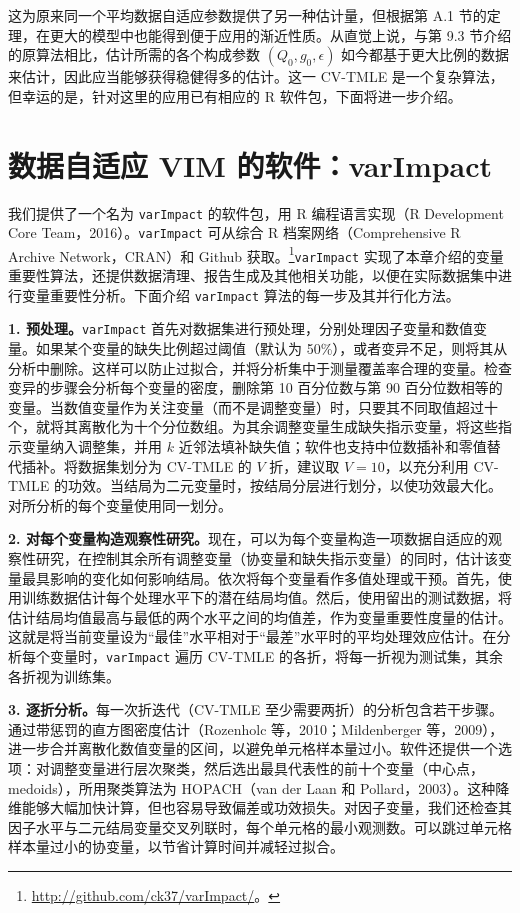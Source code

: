 这为原来同一个平均数据自适应参数提供了另一种估计量，但根据第 A.1 节的定理，在更大的模型中也能得到便于应用的渐近性质。从直觉上说，与第 9.3 节介绍的原算法相比，估计所需的各个构成参数 $(Q_0,g_0,\epsilon)$ 如今都基于更大比例的数据来估计，因此应当能够获得稳健得多的估计。这一 CV-TMLE 是一个复杂算法，但幸运的是，针对这里的应用已有相应的 R 软件包，下面将进一步介绍。

\section{数据自适应 VIM 的软件：varImpact}

我们提供了一个名为 \texttt{varImpact} 的软件包，用 R 编程语言实现（R Development Core Team，2016）。\texttt{varImpact} 可从综合 R 档案网络（Comprehensive R Archive Network，CRAN）和 Github 获取。\footnote{\url{http://github.com/ck37/varImpact/}。}\texttt{varImpact} 实现了本章介绍的变量重要性算法，还提供数据清理、报告生成及其他相关功能，以便在实际数据集中进行变量重要性分析。下面介绍 \texttt{varImpact} 算法的每一步及其并行化方法。

\noindent\textbf{1. 预处理。}\texttt{varImpact} 首先对数据集进行预处理，分别处理因子变量和数值变量。如果某个变量的缺失比例超过阈值（默认为 50\%），或者变异不足，则将其从分析中删除。这样可以防止过拟合，并将分析集中于测量覆盖率合理的变量。检查变异的步骤会分析每个变量的密度，删除第 10 百分位数与第 90 百分位数相等的变量。当数值变量作为关注变量（而不是调整变量）时，只要其不同取值超过十个，就将其离散化为十个分位数组。为其余调整变量生成缺失指示变量，将这些指示变量纳入调整集，并用 $k$ 近邻法填补缺失值；软件也支持中位数插补和零值替代插补。将数据集划分为 CV-TMLE 的 $V$ 折，建议取 $V=10$，以充分利用 CV-TMLE 的功效。当结局为二元变量时，按结局分层进行划分，以使功效最大化。对所分析的每个变量使用同一划分。

\noindent\textbf{2. 对每个变量构造观察性研究。}现在，可以为每个变量构造一项数据自适应的观察性研究，在控制其余所有调整变量（协变量和缺失指示变量）的同时，估计该变量最具影响的变化如何影响结局。依次将每个变量看作多值处理或干预。首先，使用训练数据估计每个处理水平下的潜在结局均值。然后，使用留出的测试数据，将估计结局均值最高与最低的两个水平之间的均值差，作为变量重要性度量的估计。这就是将当前变量设为“最佳”水平相对于“最差”水平时的平均处理效应估计。在分析每个变量时，\texttt{varImpact} 遍历 CV-TMLE 的各折，将每一折视为测试集，其余各折视为训练集。

\noindent\textbf{3. 逐折分析。}每一次折迭代（CV-TMLE 至少需要两折）的分析包含若干步骤。通过带惩罚的直方图密度估计（Rozenholc 等，2010；Mildenberger 等，2009），进一步合并离散化数值变量的区间，以避免单元格样本量过小。软件还提供一个选项：对调整变量进行层次聚类，然后选出最具代表性的前十个变量（中心点，medoids），所用聚类算法为 HOPACH（van der Laan 和 Pollard，2003）。这种降维能够大幅加快计算，但也容易导致偏差或功效损失。对因子变量，我们还检查其因子水平与二元结局变量交叉列联时，每个单元格的最小观测数。可以跳过单元格样本量过小的协变量，以节省计算时间并减轻过拟合。

